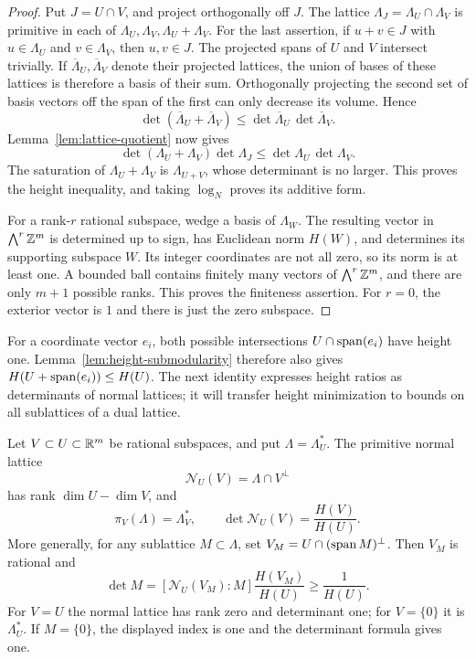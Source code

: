 \begin{proof}
Put \(J=U\cap V\), and project orthogonally off \(J\).
The lattice \(\Lambda_J=\Lambda_U\cap\Lambda_V\) is primitive in
each of \(\Lambda_U,\Lambda_V,\Lambda_U+\Lambda_V\). For the last
assertion, if \(u+v\in J\) with \(u\in\Lambda_U\) and
\(v\in\Lambda_V\), then \(u,v\in J\).
The projected spans of \(U\) and \(V\) intersect trivially. If
\(\overline\Lambda_U,\overline\Lambda_V\) denote their projected
lattices, the union of bases of these lattices is therefore a basis
of their sum. Orthogonally projecting the second set of basis
vectors off the span of the first can only decrease its volume.
Hence
\[
 \det(\overline\Lambda_U+\overline\Lambda_V)
 \le \det\overline\Lambda_U\,\det\overline\Lambda_V.
\]
Lemma~\ref{lem:lattice-quotient} now gives
\[
 \det(\Lambda_U+\Lambda_V)\det\Lambda_J
 \le \det\Lambda_U\,\det\Lambda_V.
\]
The saturation of \(\Lambda_U+\Lambda_V\) is
\(\Lambda_{U+V}\), whose determinant is no larger. This proves the
height inequality, and taking \(\log_N\) proves its additive form.

For a rank-\(r\) rational subspace, wedge a basis of \(\Lambda_W\).
The resulting vector in \(\bigwedge^r\mathbb Z^m\) is determined up to sign,
has Euclidean norm \(H(W)\), and determines its supporting subspace
\(W\).
Its integer coordinates are not all zero, so its norm is at least
one. A bounded ball contains finitely many vectors of
\(\bigwedge^r\mathbb Z^m\), and there are only \(m+1\) possible ranks.
This proves the finiteness assertion. For \(r=0\), the exterior
vector is \(1\) and there is just the zero subspace.
\end{proof}

For a coordinate vector \(e_i\), both possible intersections
\(U\cap\operatorname{span}(e_i)\) have height one.
Lemma~\ref{lem:height-submodularity} therefore also gives
\(H(U+\operatorname{span}(e_i))\le H(U)\). The next identity expresses height
ratios as determinants of normal lattices; it will transfer height
minimization to bounds on all sublattices of a dual lattice.

\begin{lemma}\label{lem:normal-height}
Let \(V\subset U\subset\mathbb R^m\) be rational subspaces, and put
\(\Lambda=\Lambda_U^*\). The primitive normal lattice
\[
 \mathcal N_U(V)=\Lambda\cap V^\perp
\]
has rank \(\dim U-\dim V\), and
\[
 \pi_V(\Lambda)=\Lambda_V^*,\qquad
 \det\mathcal N_U(V)=\frac{H(V)}{H(U)}.
\]
More generally, for any sublattice \(M\subset\Lambda\), set
\(V_M=U\cap(\operatorname{span} M)^\perp\). Then \(V_M\) is rational and
\[
 \det M=[\mathcal N_U(V_M):M]\frac{H(V_M)}{H(U)}
 \ge \frac1{H(U)}.
\]
For \(V=U\) the normal lattice has rank zero and determinant one;
for \(V=\{0\}\) it is \(\Lambda_U^*\). If \(M=\{0\}\), the displayed
index is one and the determinant formula gives one.
\end{lemma}

